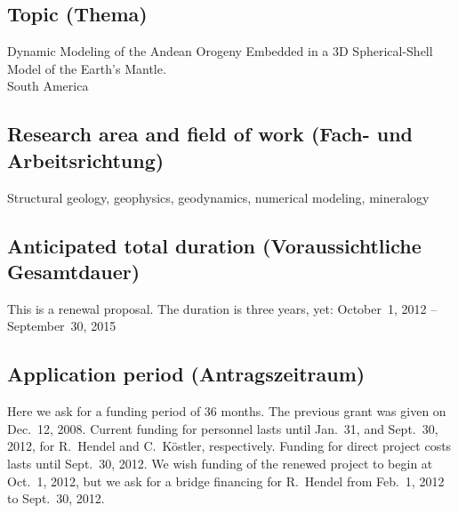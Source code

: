 \documentclass[twoside,10pt]{article}
\begin{document}
\subsection{Topic (Thema)}
Dynamic Modeling of the Andean Orogeny Embedded in a 3D Spherical-Shell 
Model of the Earth's Mantle. \\
South America


\subsection{Research area and field of work (Fach- und Arbeitsrichtung)}
Structural geology, geophysics, geodynamics, numerical modeling, mineralogy

\subsection{Anticipated total duration (Voraussichtliche Gesamtdauer)}
This is a renewal proposal. The duration is three years, yet: October~1, 2012 -- September~30, 2015

\subsection{Application period (Antragszeitraum)}
Here we ask for a funding period of 36 months. The previous grant was given on Dec.~12, 2008.
Current funding for personnel lasts until Jan.~31, and Sept.~30, 2012, for R.~Hendel and C.~K\"ostler, respectively.
Funding for direct project costs lasts until Sept.~30, 2012.
We wish funding of the renewed project to begin at Oct.~1, 2012, 
but we ask for a bridge financing for R.~Hendel from Feb.~1, 2012 to Sept.~30, 2012.
\end{document}
